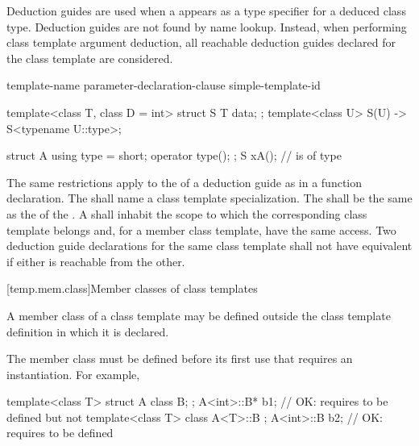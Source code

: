 \pnum
Deduction guides are used
when a  appears
as a type specifier
for a deduced class type.
Deduction guides are not found by name lookup.
Instead, when performing class template argument deduction,
all reachable deduction guides declared for the class template are considered.

\begin{bnf}
\br
     template-name \terminal{(} parameter-declaration-clause \terminal{)} \terminal{->} simple-template-id \terminal{;}
\end{bnf}

\pnum
\begin{example}
\begin{codeblock}
template<class T, class D = int>
struct S {
  T data;
};
template<class U>
S(U) -> S<typename U::type>;

struct A {
  using type = short;
  operator type();
};
S x{A()};           //  is of type 
\end{codeblock}
\end{example}

\pnum
The same restrictions apply
to the 
of a deduction guide
as in a function declaration.
The 
shall name a class template specialization.
The 
shall be the same 
as the 
of the .
A 
shall inhabit the scope
to which the corresponding class template belongs
and, for a member class template, have the same access.
Two deduction guide declarations
for the same class template
shall not have equivalent 
if either is reachable from the other.

[temp.mem.class]{Member classes of class templates}

\pnum
A member class of a class template may be defined outside the class template
definition in which it is declared.
\begin{note}
The member class must be defined before its first use that requires
an instantiation.
For example,
\begin{codeblock}
template<class T> struct A {
  class B;
};
A<int>::B* b1;                          // OK: requires  to be defined but not 
template<class T> class A<T>::B { };
A<int>::B  b2;                          // OK: requires  to be defined
\end{codeblock}
\end{note}

